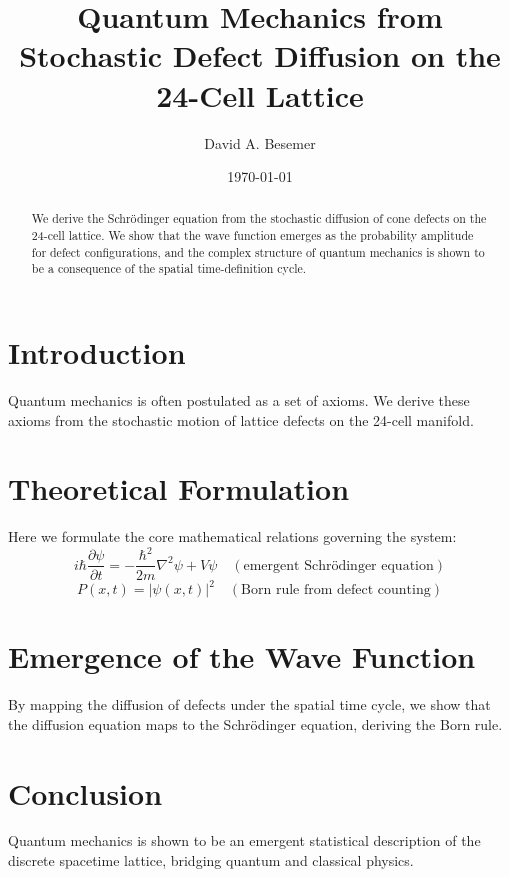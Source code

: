 \documentclass[amsmath,amssymb,aps,prd,twocolumn,superscriptaddress,nofootinbib]{revtex4-2}
\begin{document}

\title{Quantum Mechanics from Stochastic Defect Diffusion on the 24-Cell Lattice}

\author{David A. Besemer}

\date{\today}

\begin{abstract}
We derive the Schrödinger equation from the stochastic diffusion of cone defects on the 24-cell lattice. We show that the wave function emerges as the probability amplitude for defect configurations, and the complex structure of quantum mechanics is shown to be a consequence of the spatial time-definition cycle.
\end{abstract}

\maketitle

\section{Introduction}
Quantum mechanics is often postulated as a set of axioms. We derive these axioms from the stochastic motion of lattice defects on the 24-cell manifold.

\section{Theoretical Formulation}
Here we formulate the core mathematical relations governing the system:
\begin{equation}
  i\hbar\frac{\partial\psi}{\partial t} = -\frac{\hbar^2}{2m}\nabla^2\psi + V\psi \quad (\text{emergent Schr{\"o}dinger equation})
\end{equation}
\begin{equation}
  P(x,t) = \lvert\psi(x,t)\rvert^2 \quad (\text{Born rule from defect counting})
\end{equation}
\section{Emergence of the Wave Function}
By mapping the diffusion of defects under the spatial time cycle, we show that the diffusion equation maps to the Schrödinger equation, deriving the Born rule.

\section{Conclusion}
Quantum mechanics is shown to be an emergent statistical description of the discrete spacetime lattice, bridging quantum and classical physics.
\end{document}
